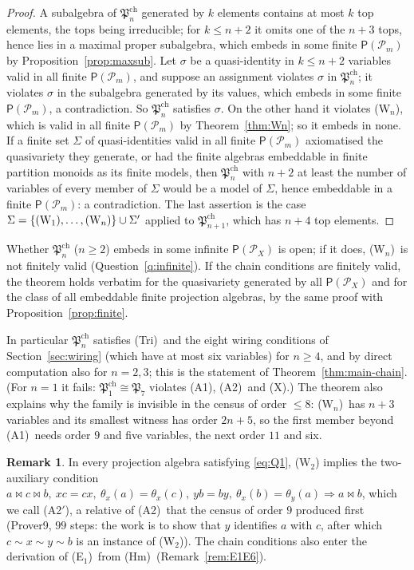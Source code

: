 \documentclass[11pt]{amsart}
\theoremstyle{definition}
\newtheorem{remark}[theorem]{Remark}
\renewcommand{\P}{\mathcal{P}}      %
\newcommand{\PA}{\mathsf{P}}         %
\newcommand{\mt}{\bowtie}      %
\newcommand{\Tri}{\textup{(Tri)}}
\newcommand{\Rcond}{\textup{(A1)}}     %
\newcommand{\Rp}{\textup{(A2)}}        %
\newcommand{\Rpp}{\textup{(A2$'$)}}    %
\newcommand{\Vcond}{\textup{(X)}}      %
\newcommand{\Eone}{\textup{(E$_1$)}}
\newcommand{\Kzero}{\textup{(Hm)}}     %
\newcommand{\Wn}[1][n]{\textup{(W$_{#1}$)}}
\begin{document}
\begin{proof}
A subalgebra of $\mathfrak P^{\mathrm{ch}}_n$ generated by $k$ elements contains at most $k$ top elements, the tops being irreducible; for $k\le n+2$ it omits one of the $n+3$ tops, hence lies in a maximal proper subalgebra, which embeds in some finite $\PA(\P_m)$ by Proposition~\ref{prop:maxsub}. Let $\sigma$ be a quasi-identity in $k\le n+2$ variables valid in all finite $\PA(\P_m)$, and suppose an assignment violates $\sigma$ in $\mathfrak P^{\mathrm{ch}}_n$; it violates $\sigma$ in the subalgebra generated by its values, which embeds in some finite $\PA(\P_m)$, a contradiction. So $\mathfrak P^{\mathrm{ch}}_n$ satisfies $\sigma$. On the other hand it violates \Wn, which is valid in all finite $\PA(\P_m)$ by Theorem~\ref{thm:Wn}; so it embeds in none. If a finite set $\Sigma$ of quasi-identities valid in all finite $\PA(\P_m)$ axiomatised the quasivariety they generate, or had the finite algebras embeddable in finite partition monoids as its finite models, then $\mathfrak P^{\mathrm{ch}}_n$ with $n+2$ at least the number of variables of every member of $\Sigma$ would be a model of $\Sigma$, hence embeddable in a finite $\PA(\P_m)$: a contradiction. The last assertion is the case $\Sigma=\{\Wn[1],\dots,\Wn\}\cup\Sigma'$ applied to $\mathfrak P^{\mathrm{ch}}_{n+1}$, which has $n+4$ top elements.
\end{proof}

Whether $\mathfrak P^{\mathrm{ch}}_n$ ($n\ge2$) embeds in some infinite $\PA(\P_X)$ is open; if it does, \Wn\ is not finitely valid (Question~\ref{q:infinite}). If the chain conditions are finitely valid, the theorem holds verbatim for the quasivariety generated by all $\PA(\P_X)$ and for the class of all embeddable finite projection algebras, by the same proof with Proposition~\ref{prop:finite}.

In particular $\mathfrak P^{\mathrm{ch}}_n$ satisfies \Tri\ and the eight wiring conditions of Section~\ref{sec:wiring} (which have at most six variables) for $n\ge4$, and by direct computation also for $n=2,3$; this is the statement of Theorem~\ref{thm:main-chain}. (For $n=1$ it fails: $\mathfrak P^{\mathrm{ch}}_1\cong\mathfrak P_7$ violates \Rcond, \Rp\ and \Vcond.) The theorem also explains why the family is invisible in the census of order $\le8$: \Wn\ has $n+3$ variables and its smallest witness has order $2n+5$, so the first member beyond \Rcond\ needs order $9$ and five variables, the next order $11$ and six.

\begin{remark}\label{rem:W2}
In every projection algebra satisfying \eqref{eq:Q1}, \Wn[2] implies the two-auxiliary condition $a\mt c\mt b,\ xc=cx,\ \theta_x(a)=\theta_x(c),\ yb=by,\ \theta_x(b)=\theta_y(a)\Rightarrow a\mt b$, which we call \Rpp, a relative of \Rp\ that the census of order $9$ produced first (Prover9, $99$ steps: the work is to show that $y$ identifies $a$ with $c$, after which $c\sim x\sim y\sim b$ is an instance of \Wn[2]). The chain conditions also enter the derivation of \Eone\ from \Kzero\ (Remark~\ref{rem:E1E6}).
\end{remark}
\end{document}
